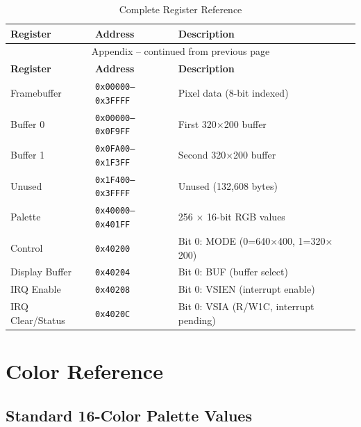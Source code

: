 \documentclass[11pt,letterpaper]{report}
\begin{document}
\begin{longtable}{p{3cm}p{2cm}p{7cm}}
\caption{Complete Register Reference}
\label{tab:reg_reference} \\
\toprule
\textbf{Register} & \textbf{Address} & \textbf{Description} \\
\midrule
\endfirsthead

\multicolumn{3}{c}{Appendix -- continued from previous page} \\
\toprule
\textbf{Register} & \textbf{Address} & \textbf{Description} \\
\midrule
\endhead

\bottomrule
\endfoot

\bottomrule
\endlastfoot

Framebuffer & \texttt{0x00000--0x3FFFF} & Pixel data (8-bit indexed) \\
Buffer 0 & \texttt{0x00000--0x0F9FF} & First 320$\times$200 buffer \\
Buffer 1 & \texttt{0x0FA00--0x1F3FF} & Second 320$\times$200 buffer \\
Unused   & \texttt{0x1F400--0x3FFFF} & Unused (132,608 bytes) \\
Palette & \texttt{0x40000--0x401FF} & 256 $\times$ 16-bit RGB values \\
Control & \texttt{0x40200} & Bit 0: MODE (0=640$\times$400, 1=320$\times$200) \\
Display Buffer & \texttt{0x40204} & Bit 0: BUF (buffer select) \\
IRQ Enable & \texttt{0x40208} & Bit 0: VSIEN (interrupt enable) \\
IRQ Clear/Status & \texttt{0x4020C} & Bit 0: VSIA (R/W1C, interrupt pending) \\
\end{longtable}

\section{Color Reference}

\subsection{Standard 16-Color Palette Values}
\end{document}
